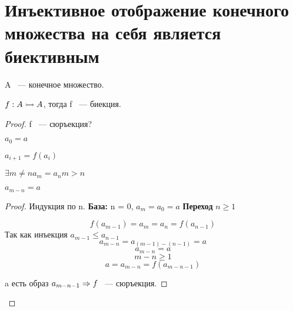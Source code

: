 ﻿\section{Инъективное отображение конечного множества на себя является биективным}

\begin{theorem}{}
A ~--- конечное множество. 

$f: A \rightarrowtail A $, тогда f ~--- биекция.
\end{theorem}

\begin{proof}
f ~--- сюръекция? 

$a_0 = a$

$a_{i + 1} = f(a_i)$

$\exists m \ne n a_m = a_n m > n$

\begin{lemma}{}
    $a_{m - n} = a$    
\end{lemma}
    \begin{proof}
        Индукция по n.
        {\bf База:} n = 0, $a_m = a_0 = a$
        {\bf Переход} $n \ge 1$

        $$f(a_{m - 1}) = a_m = a_n = f(a_{n - 1})$$
        Так как инъекция $a_{m - 1} \le a_{n - 1}$
        $$a_{m - n} = a_{(m - 1) - (n - 1)} = a$$
        $$a_{m - n} = a$$
        $$m - n \ge 1$$
        $$a = a_{m - n} = f(a_{m - n - 1})$$

        a есть образ $a_{m - n - 1} \Rightarrow f$ ~--- сюръекция.
    \end{proof}
\end{proof}